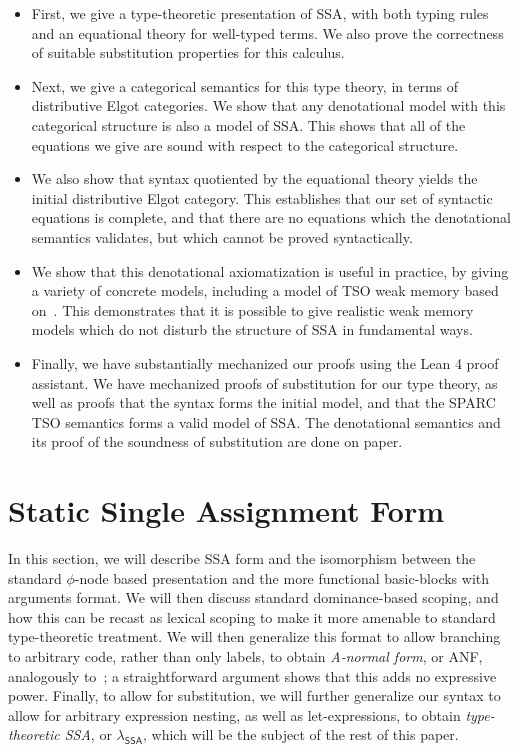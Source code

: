 \documentclass[acmsmall,screen,review]{acmart}
\newcommand{\ms}[1]{\ensuremath{\mathsf{#1}}}
\newcommand{\isotopessa}{\(\lambda_{\ms{SSA}}\)}
\begin{document}
\begin{itemize}
\item First, we give a type-theoretic presentation of SSA, with both typing rules and an equational
  theory for well-typed terms. We also prove the correctness of suitable substitution properties for
  this calculus. 
  
\item Next, we give a categorical semantics for this type theory, in terms of distributive Elgot
  categories. We show that any denotational model with this categorical structure is also a model of
  SSA. This shows that all of the equations we give are sound with respect to the categorical
  structure. 

\item We also show that syntax quotiented by the equational theory yields the initial distributive
  Elgot category. This establishes that our set of syntactic equations is complete, and that there
  are no equations which the denotational semantics validates, but which cannot be proved
  syntactically. 

\item We show that this denotational axiomatization is useful in practice, by giving a variety of
  concrete models, including a model of TSO weak memory based on~\cite{sparky}. This demonstrates
  that it is possible to give realistic weak memory models which do not disturb the structure of SSA
  in fundamental ways.

\item Finally, we have substantially mechanized our proofs using the Lean 4 proof assistant. We have
  mechanized proofs of substitution for our type theory, as well as proofs that the syntax forms the
  initial model, and that the SPARC TSO semantics forms a valid model of SSA. The denotational
  semantics and its proof of the soundness of substitution are done on paper. 

\end{itemize}

\section{Static Single Assignment Form}

In this section, we will describe SSA form and the isomorphism between the standard $\phi$-node
based presentation and the more functional basic-blocks with arguments format. We will then discuss
standard dominance-based scoping, and how this can be recast as lexical scoping to make it more
amenable to standard type-theoretic treatment. We will then generalize this format to allow
branching to arbitrary code, rather than only labels, to obtain \textit{A-normal form}, or ANF,
analogously to~\citet{anf}; a straightforward argument shows that this adds no expressive power.
Finally, to allow for substitution, we will further generalize our syntax to allow for arbitrary
expression nesting, as well as let-expressions, to obtain \textit{type-theoretic SSA}, or
\isotopessa, which will be the subject of the rest of this paper.
\end{document}
